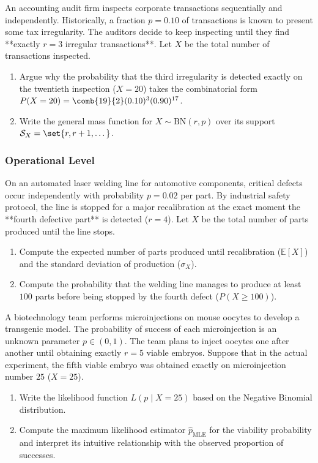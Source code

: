 \begin{problema}
	\label{prob:3.5.3}
	An accounting audit firm inspects corporate transactions sequentially and independently. Historically, a fraction $p = 0.10$ of transactions is known to present some tax irregularity. The auditors decide to keep inspecting until they find **exactly $r = 3$ irregular transactions**. Let $X$ be the total number of transactions inspected.
	\begin{enumerate}
		\item Argue why the probability that the third irregularity is detected exactly on the twentieth inspection ($X = 20$) takes the combinatorial form $P(X = 20) = \comb{19}{2} (0.10)^3 (0.90)^{17}$.
		\item Write the general mass function for $X \sim \text{BN}(r, p)$ over its support $\mathcal{S}_X = \set{r, r+1, \dots}$.
	\end{enumerate}
\end{problema}

\subsubsection*{Operational Level}

\begin{problema}
	\label{prob:3.5.4}
	On an automated laser welding line for automotive components, critical defects occur independently with probability $p = 0.02$ per part. By industrial safety protocol, the line is stopped for a major recalibration at the exact moment the **fourth defective part** is detected ($r = 4$). Let $X$ be the total number of parts produced until the line stops.
	\begin{enumerate}
		\item Compute the expected number of parts produced until recalibration ($\mathbb{E}[X]$) and the standard deviation of production ($\sigma_X$).
		\item Compute the probability that the welding line manages to produce at least $100$ parts before being stopped by the fourth defect ($P(X \ge 100)$).
	\end{enumerate}
\end{problema}

\begin{problema}
	\label{prob:3.5.5}
	A biotechnology team performs microinjections on mouse oocytes to develop a transgenic model. The probability of success of each microinjection is an unknown parameter $p \in (0, 1)$. The team plans to inject oocytes one after another until obtaining exactly $r = 5$ viable embryos. Suppose that in the actual experiment, the fifth viable embryo was obtained exactly on microinjection number $25$ ($X = 25$).
	\begin{enumerate}
		\item Write the likelihood function $L(p \mid X = 25)$ based on the Negative Binomial distribution.
		\item Compute the maximum likelihood estimator $\hat{p}_{\text{MLE}}$ for the viability probability and interpret its intuitive relationship with the observed proportion of successes.
	\end{enumerate}
\end{problema}

